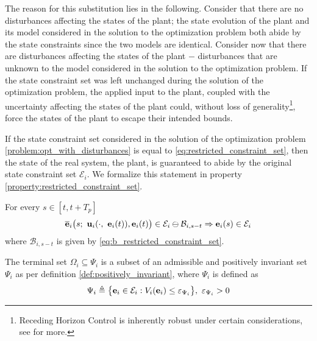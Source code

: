 The reason for this substitution lies in the following. Consider that there
are no disturbances affecting the states of the plant; the state evolution of
the plant and its model considered in the solution to the optimization problem
both abide by the state constraints since the two models are identical. Consider
now that there are disturbances affecting the states of the plant $-$
disturbances that are unknown to the model considered in the solution to the
optimization problem. If the state constraint set was left unchanged during the
solution of the optimization problem, the applied input to the plant, coupled
with the uncertainty affecting the states of the plant could, without loss of
generality\footnote{Receding Horizon Control is inherently robust
under certain considerations, see \cite{Fontes2007} for more.}, force the states
of the plant to escape their intended bounds.

If the state constraint set considered in the solution of the optimization
problem \eqref{problem:opt_with_disturbances} is equal to
\eqref{eq:restricted_constraint_set}, then the state of the real system,
the plant, is guaranteed to abide by the original state constraint set
$\mathcal{E}_i$. We formalize this statement in property
\eqref{property:restricted_constraint_set}.\\[1ex]

\begin{bw_box}
  \begin{property}
  \label{property:restricted_constraint_set}

  For every $s \in [t, t + T_p]$
  \begin{align}
    \overline{\bm{\mathbf{e}}}_i\big( s;\ \bm{\mathbf{u}}_i(\cdot,\ \bm{\mathbf{e}}_i(t)), \bm{\mathbf{e}}_i(t) \big) \in \mathcal{E}_i \ominus \mathcal{B}_{i,s-t}
    \Rightarrow
    \bm{\mathbf{e}}_i(s) \in \mathcal{E}_i
  \end{align}
  where $\mathcal{B}_{i,s-t}$ is given by \eqref{eq:b_restricted_constraint_set}.
\end{property}
\end{bw_box}



\begin{bw_box}
  \begin{assumption}
  \label{ass:psi}
  The terminal set $\Omega_i \subseteq \Psi_i$ is a subset of an admissible and
  positively invariant set $\Psi_i$ as per definition
  \eqref{def:positively_invariant}, where $\Psi_i$ is defined as
  \begin{align}
    \Psi_i \triangleq \big\{\bm{\mathbf{e}}_i \in \mathcal{E}_i : V_i(\bm{\mathbf{e}}_i)
      \leq \varepsilon_{\Psi_i} \big\},\ \varepsilon_{\Psi_i} > 0
  \end{align}
  \end{assumption}
\end{bw_box}

